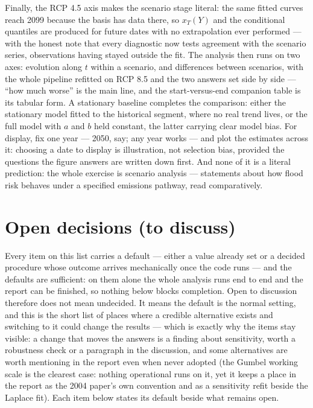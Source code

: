 \documentclass[11pt]{article}
\begin{document}
Finally, the RCP 4.5 axis makes the scenario stage literal: the same fitted curves reach 2099 because the basis has data there, so $x_T(Y)$ and the conditional quantiles are produced for future dates with no extrapolation ever performed --- with the honest note that every diagnostic now tests agreement with the scenario series, observations having stayed outside the fit. The analysis then runs on two axes: evolution along $t$ within a scenario, and differences between scenarios, with the whole pipeline refitted on RCP 8.5 and the two answers set side by side --- ``how much worse'' is the main line, and the start-versus-end companion table is its tabular form. A stationary baseline completes the comparison: either the stationary model fitted to the historical segment, where no real trend lives, or the full model with $a$ and $b$ held constant, the latter carrying clear model bias. For display, fix one year --- 2050, say; any year works --- and plot the estimates across it: choosing a date to display is illustration, not selection bias, provided the questions the figure answers are written down first. And none of it is a literal prediction: the whole exercise is scenario analysis --- statements about how flood risk behaves under a specified emissions pathway, read comparatively.

\section{Open decisions (to discuss)}\label{sec:open}

Every item on this list carries a default --- either a value already set or a decided procedure whose outcome arrives mechanically once the code runs --- and the defaults are sufficient: on them alone the whole analysis runs end to end and the report can be finished, so nothing below blocks completion. Open to discussion therefore does not mean undecided. It means the default is the normal setting, and this is the short list of places where a credible alternative exists and switching to it could change the results --- which is exactly why the items stay visible: a change that moves the answers is a finding about sensitivity, worth a robustness check or a paragraph in the discussion, and some alternatives are worth mentioning in the report even when never adopted {\color{green}(the Gumbel working scale is the clearest case: nothing operational runs on it, yet it keeps a place in the report as the 2004 paper's own convention and as a sensitivity refit beside the Laplace fit)}. Each item below states its default beside what remains open.
\end{document}
